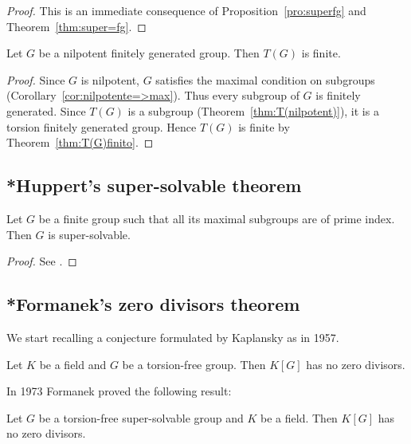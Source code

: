 \begin{proof}
    This is an immediate consequence of Proposition~\ref{pro:superfg} and 
    Theorem~\ref{thm:super=fg}.  
\end{proof}

\begin{theorem}
    Let $G$ be a nilpotent finitely generated group. Then $T(G)$ is finite. 
\end{theorem}

\begin{proof}
    Since $G$ is nilpotent, $G$ satisfies the maximal condition on subgroups 
    (Corollary~\ref{cor:nilpotente=>max}). Thus 
	every subgroup of $G$ is finitely generated. Since 
    $T(G)$ is a subgroup (Theorem~\ref{thm:T(nilpotent)}), it is a torsion finitely generated group. 
	Hence $T(G)$ is finite by Theorem~\ref{thm:T(G)finito}.
\end{proof}

\subsection{*Huppert's super-solvable theorem}

\begin{theorem}[Huppert]
\label{thm:Huppert}
Let $G$ be a finite group such that all its maximal subgroups 
are of prime index. Then $G$ is super-solvable. 
\end{theorem}

\begin{proof}
    See \cite[Theorem 10.5.8]{MR414669}.
\end{proof}

\subsection{*Formanek's zero divisors theorem}

We start recalling a conjecture formulated by Kaplansky as \cite[Problem 6]{MR0096696} in 1957. 

\begin{conjecture}[Kaplansky]
\label{conjecture:zero}
    Let $K$ be a field and $G$ be a torsion-free group. 
    Then $K[G]$ has no zero divisors. 
\end{conjecture}

In 1973 Formanek proved the following result:

\begin{theorem}[Formanek]
    \label{thm:Formanek:zerodivisors}
        Let $G$ be a torsion-free super-solvable 
        group and $K$ be a field. Then $K[G]$ has no zero divisors. 
\end{theorem}

